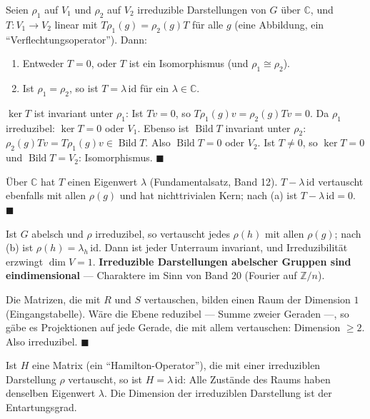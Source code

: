 \begin{merksatz}
Seien $\rho_1$ auf $V_1$ und $\rho_2$ auf $V_2$ irreduzible Darstellungen von $G$ über $\mathbb C$, und $T\colon V_1\to V_2$ linear mit $T\rho_1(g) = \rho_2(g)T$ für alle $g$ (eine  Abbildung, ein \enquote{Verflechtungsoperator}). Dann:
\begin{enumerate}[label=(\alph*), leftmargin=1.6em]
\item Entweder $T = 0$, oder $T$ ist ein Isomorphismus (und $\rho_1\cong\rho_2$).
\item Ist $\rho_1 = \rho_2$, so ist $T = \lambda\,\mathrm{id}$ für ein $\lambda\in\mathbb C$.
\end{enumerate}

$\ker T$ ist invariant unter $\rho_1$: Ist $Tv = 0$, so $T\rho_1(g)v = \rho_2(g)Tv = 0$. Da $\rho_1$ irreduzibel: $\ker T = 0$ oder $V_1$. Ebenso ist $\operatorname{Bild}T$ invariant unter $\rho_2$: $\rho_2(g)Tv = T\rho_1(g)v\in\operatorname{Bild}T$. Also $\operatorname{Bild}T = 0$ oder $V_2$. Ist $T\ne0$, so $\ker T = 0$ und $\operatorname{Bild}T = V_2$: Isomorphismus. $\blacksquare$

Über $\mathbb C$ hat $T$ einen Eigenwert $\lambda$ (Fundamentalsatz, Band 12). $T - \lambda\,\mathrm{id}$ vertauscht ebenfalls mit allen $\rho(g)$ und hat nichttrivialen Kern; nach (a) ist $T - \lambda\,\mathrm{id} = 0$. $\blacksquare$

Ist $G$ abelsch und $\rho$ irreduzibel, so vertauscht jedes $\rho(h)$ mit allen $\rho(g)$; nach (b) ist $\rho(h) = \lambda_h\,\mathrm{id}$. Dann ist jeder Unterraum invariant, und Irreduzibilität erzwingt $\dim V = 1$. \textbf{Irreduzible Darstellungen abelscher Gruppen sind eindimensional} --- Charaktere im Sinn von Band 20 (Fourier auf $\mathbb Z/n$).

Die Matrizen, die mit $R$ und $S$ vertauschen, bilden einen Raum der Dimension $1$ (Eingangstabelle). Wäre die Ebene reduzibel --- Summe zweier Geraden ---, so gäbe es Projektionen auf jede Gerade, die mit allem vertauschen: Dimension $\ge2$. Also irreduzibel. $\blacksquare$

Ist $H$ eine Matrix (ein \enquote{Hamilton-Operator}), die mit einer irreduziblen Darstellung $\rho$ vertauscht, so ist $H = \lambda\,\mathrm{id}$: Alle Zustände des Raums haben denselben Eigenwert $\lambda$. Die Dimension der irreduziblen Darstellung ist der Entartungsgrad.


\end{merksatz}
